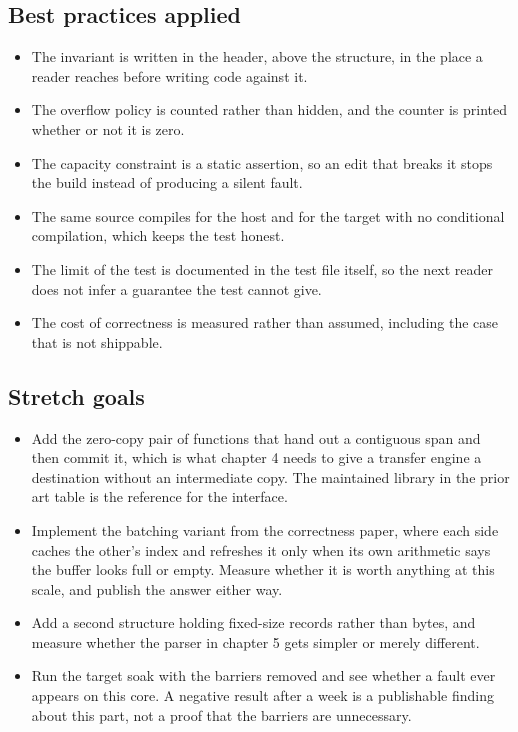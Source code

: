 \subsection*{Best practices applied}

\begin{itemize}
\item The invariant is written in the header, above the structure, in the place
a reader reaches before writing code against it.
\item The overflow policy is counted rather than hidden, and the counter is
printed whether or not it is zero.
\item The capacity constraint is a static assertion, so an edit that breaks it
stops the build instead of producing a silent fault.
\item The same source compiles for the host and for the target with no
conditional compilation, which keeps the test honest.
\item The limit of the test is documented in the test file itself, so the next
reader does not infer a guarantee the test cannot give.
\item The cost of correctness is measured rather than assumed, including the
case that is not shippable.
\end{itemize}

\subsection*{Stretch goals}

\begin{itemize}
\item Add the zero-copy pair of functions that hand out a contiguous span and
then commit it, which is what chapter 4 needs to give a transfer engine a
destination without an intermediate copy. The maintained library in the prior
art table is the reference for the interface.
\item Implement the batching variant from the correctness paper, where each side
caches the other's index and refreshes it only when its own arithmetic says the
buffer looks full or empty. Measure whether it is worth anything at this scale,
and publish the answer either way.
\item Add a second structure holding fixed-size records rather than bytes, and
measure whether the parser in chapter 5 gets simpler or merely different.
\item Run the target soak with the barriers removed and see whether a fault ever
appears on this core. A negative result after a week is a publishable finding
about this part, not a proof that the barriers are unnecessary.
\end{itemize}

